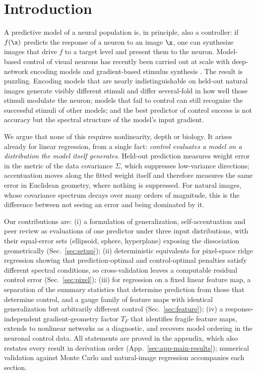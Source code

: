 \section{Introduction}
A predictive model of a neural population is, in principle, also a controller: if $f(\x)$ predicts the response of a neuron to an image $\x$, one can synthesize images that drive $f$ to a target level and present them to the neuron. Model-based control of visual neurons has recently been carried out at scale with deep-network encoding models and gradient-based stimulus synthesis \citepPW. The result is puzzling. Encoding models that are nearly indistinguishable on held-out natural images generate visibly different stimuli and differ several-fold in how well those stimuli modulate the neuron; models that fail to control can still recognize the successful stimuli of other models; and the best predictor of control success is not accuracy but the spectral structure of the model's input gradient.

We argue that none of this requires nonlinearity, depth or biology. It arises already for linear regression, from a single fact: \emph{control evaluates a model on a distribution the model itself generates}. Held-out prediction measures weight error in the metric of the data covariance $\Sigma$, which suppresses low-variance directions; accentuation moves along the fitted weight itself and therefore measures the same error in Euclidean geometry, where nothing is suppressed. For natural images, whose covariance spectrum decays over many orders of magnitude, this is the difference between not seeing an error and being dominated by it.

Our contributions are:
(i) a formulation of generalization, self-accentuation and peer review as evaluations of one predictor under three input distributions, with their equal-error sets (ellipsoid, sphere, hyperplane) exposing the dissociation geometrically (Sec.~\ref{sec:setup});
(ii) deterministic equivalents for pixel-space ridge regression showing that prediction-optimal and control-optimal penalties satisfy different spectral conditions, so cross-validation leaves a computable residual control error (Sec.~\ref{sec:pixel});
(iii) for regression on a fixed linear feature map, a separation of the summary statistics that determine prediction from those that determine control, and a gauge family of feature maps with identical generalization but arbitrarily different control (Sec.~\ref{sec:feature});
(iv) a response-independent gradient-geometry factor $T_F$ that identifies fragile feature maps, extends to nonlinear networks as a diagnostic, and recovers model ordering in the neuronal control data.
All statements are proved in the appendix, which also restates every result in derivation order (App.~\ref{sec:app-main-results}); numerical validation against Monte Carlo and natural-image regression accompanies each section.

